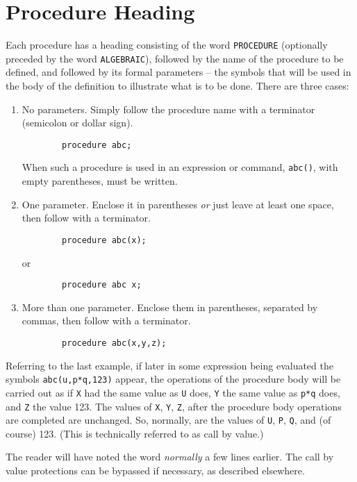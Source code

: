 \section{Procedure Heading}

Each procedure has a heading consisting of the word \texttt{PROCEDURE}
(optionally preceded by the word \texttt{ALGEBRAIC}), followed by the name of
the procedure to be defined, and followed by its formal parameters -- the
symbols that will be used in the body of the definition to illustrate
what is to be done.  There are three cases:
\begin{enumerate}
\item No parameters. Simply follow the procedure name with a terminator
(semicolon or dollar sign).
\begin{verbatim}
        procedure abc;
\end{verbatim}

When such a procedure is used in an expression or command, \texttt{abc()}, with
empty parentheses, must be written.

\item One parameter.  Enclose it in parentheses \emph{or} just leave at
least one space, then follow with a terminator.
\begin{verbatim}
        procedure abc(x);
\end{verbatim}
or
\begin{verbatim}
        procedure abc x;
\end{verbatim}

\item More than one parameter. Enclose them in parentheses, separated by
commas, then follow with a terminator.
\begin{verbatim}
        procedure abc(x,y,z);
\end{verbatim}
\end{enumerate}
Referring to the last example, if later in some expression being evaluated
the symbols \texttt{abc(u,p*q,123)} appear, the operations of the procedure
body will be carried out as if \texttt{X} had the same value as \texttt{U} does,
\texttt{Y} the same value as \texttt{p*q} does, and \texttt{Z} the value 123.  The
values of \texttt{X}, \texttt{Y}, \texttt{Z}, after the procedure body operations
are completed are unchanged.  So, normally, are the values of \texttt{U},
\texttt{P}, \texttt{Q}, and (of course) 123. (This is technically referred to as
call by value.)

The reader will have noted the word \emph{normally} a few lines earlier. The
call by value protections can be bypassed if necessary, as described
elsewhere.

